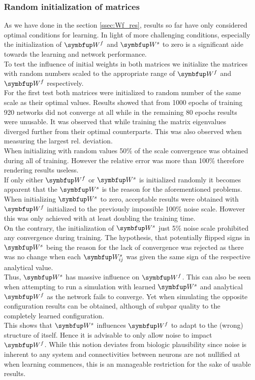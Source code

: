 \subsubsection{Random initialization of matrices}\label{sssec:rand_init}
As we have done in the section \cref{ssec:Wf_res}, results so far have only considered optimal conditions for learning. In light of more challenging conditions, especially the initialization of $\bmu{W}^f$ and $\bmu{W}^s$ to zero is a significant aide towards the learning and network performance.\\
To test the influence of initial weights in both matrices we initialize the matrices with random numbers scaled to the appropriate range of $\bmu{W}^f$ and $\bmu{W}^f$ respectively.\\
For the first test both matrices were initialized to random number of the same scale as their optimal values. Results showed that from 1000 epochs of training 920 networks did not converge at all while in the remaining 80 epochs results were unusable. It was observed that while training the matrix eigenvalues diverged further from their optimal counterparts. This was also observed when measuring the largest rel. deviation.\\
When initializing with random values 50\% of the scale convergence was obtained during all of training. However the relative error was more than 100\% therefore rendering results useless.\\
If only either $\bmu{W}^f$ or $\bmu{W}^s$ is initialized randomly it becomes apparent that the $\bmu{W}^s$ is the reason for the aforementioned problems. When initializing $\bmu{W}^s$ to zero, acceptable results were obtained with $\bmu{W}^f$ initialized to the previously impossible 100\% noise scale. However this was only achieved with at least doubling the training time.\\
On the contrary, the initialization of $\bmu{W}^s$ just 5\% noise scale prohibited any convergence during training. The hypothesis, that potentially flipped signs in $\bmu{W}^s$ being the reason for the lack of convergence was rejected as there was no change when each $\bmu{W}^s_{ij}$ was given the same sign of the respective analytical value.\\
Thus, $\bmu{W}^s$ has massive influence on $\bmu{W}^f$. This can also be seen when attempting to run a simulation with learned $\bmu{W}^s$ and analytical $\bmu{W}^f$ as the network fails to converge. Yet when simulating the opposite configuration results can be obtained, although of subpar quality to the completely learned configuration.\\
This shows that $\bmu{W}^s$ influences $\bmu{W}^f$ to adapt to the (wrong) structure of itself. Hence it is advisable to only allow noise to impact $\bmu{W}^f$. While this notion deviates from biologic plausibility since noise is inherent to any system and connectivities between neurons are not nullified at when learning commences, this is an manageable restriction for the sake of usable results.

